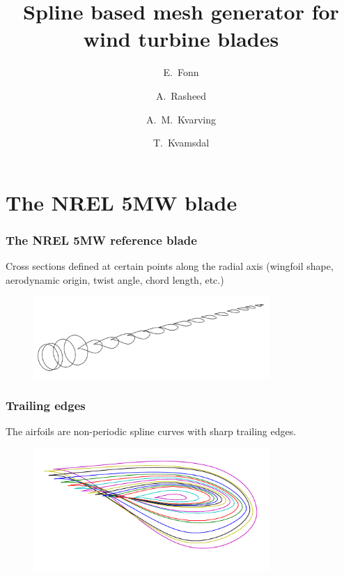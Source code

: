 \documentclass{beamer}
\begin{document}
\title[Spline mesh for wind turbine blades]{Spline based mesh generator for wind turbine blades}
\author[E. Fonn]{
  E.~Fonn \and
  A.~Rasheed \and
  A.~M.~Kvarving \and
  T.~Kvamsdal
}
\date[27th NCSM, 2014]{}


\begin{frame}
  \titlepage
\end{frame}

\section{The NREL 5MW blade}

\begin{frame}
  \frametitle{The NREL 5MW reference blade}

  Cross sections defined at certain points along the radial axis (wingfoil shape, aerodynamic
  origin, twist angle, chord length, etc.)

  \begin{figure}
    \centering
    \includegraphics[width=0.8\textwidth]{figs/cross-airfoils}
  \end{figure}
\end{frame}

\begin{frame}
  \frametitle{Trailing edges}

  The airfoils are non-periodic spline curves with sharp trailing edges.

  \begin{figure}
    \centering
    \includegraphics[width=0.8\textwidth]{figs/airfoils-note}
  \end{figure}
\end{frame}
\end{document}
